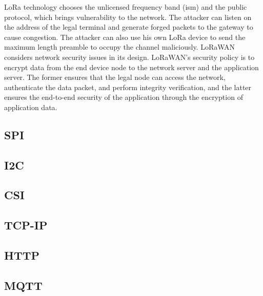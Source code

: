 LoRa technology chooses the unlicensed frequency band (\ac{ism}) and the public protocol, which brings vulnerability to the network. The attacker can listen on the address of the legal terminal and generate forged packets to the gateway to cause congestion. The attacker can also use his own LoRa device to send the maximum length preamble to occupy the channel maliciously. LoRaWAN considers network security issues in its design. LoRaWAN’s security policy is to encrypt data from the end device node to the network server and the application server. The former ensures that the legal node can access the network, authenticate the data packet, and perform integrity verification, and the latter ensures the end-to-end security of the application through the encryption of application data.




\subsection{SPI}
\subsection{I2C}

\subsection{CSI}

\subsection{TCP-IP}

\subsection{HTTP}
\subsection{MQTT}